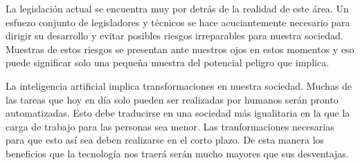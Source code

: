 \documentclass[12pt,a4paper]{article}
\begin{document}
La legislación actual se encuentra muy por detrás de la realidad de este área. Un esfuezo conjunto de legisladores y técnicos se hace acuciantemente necesario para dirigir su desarrollo y evitar posibles riesgos irreparables para nuestra sociedad. Muestras de estos riesgos se presentan ante nuestros ojos en estos momentos y eso puede significar solo una pequeña muestra del potencial peligro que implica.

La inteligencia artificial implica transformaciones en nuestra sociedad. Muchas de las tareas que hoy en día solo pueden ser realizadas por humanos serán pronto automatizadas. Esto debe traducirse en una sociedad más igualitaria en la que la carga de trabajo para las personas sea menor. Las tranformaciones necesarias para que esto así sea deben realizarse en el corto plazo. De esta manera los beneficios que la tecnología nos traerá serán mucho mayores que sus desventajas.

\newpage
\end{document}
